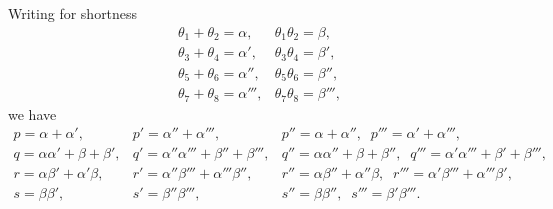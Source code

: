 \documentclass[11pt]{article}
\begin{document}
Writing for shortness
\[
\begin{array}{llll}
\theta_1 + \theta_2 = \alpha, & \theta_1\theta_2 = \beta,\\
\theta_3 + \theta_4 = \alpha', & \theta_3\theta_4 = \beta',\\
\theta_5 + \theta_6 = \alpha'', & \theta_5\theta_6 = \beta'',\\
\theta_7 + \theta_8 = \alpha''', & \theta_7\theta_8 = \beta''',
\end{array}
\]
we have
\[
\begin{array}{lll}
p = \alpha + \alpha', & p' = \alpha'' + \alpha''', & p'' = \alpha + \alpha'',\;\; p''' = \alpha' + \alpha''',\\
q = \alpha\alpha' + \beta + \beta', & q' = \alpha''\alpha''' + \beta'' + \beta''', & q'' = \alpha\alpha'' + \beta + \beta'',\;\; q''' = \alpha'\alpha''' + \beta' + \beta''',\\
r = \alpha\beta' + \alpha'\beta, & r' = \alpha''\beta''' + \alpha'''\beta'', & r'' = \alpha\beta'' + \alpha''\beta,\;\; r''' = \alpha'\beta''' + \alpha'''\beta',\\
s = \beta\beta', & s' = \beta''\beta''', & s'' = \beta\beta'',\;\; s''' = \beta'\beta'''.
\end{array}
\]
\end{document}
